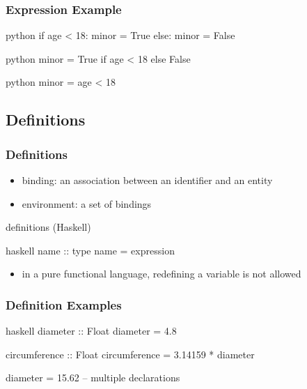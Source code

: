 \documentclass[dvipsnames]{beamer}
\theoremstyle{plain}
\begin{document}
\begin{frame}[fragile]
  \frametitle{Expression Example}

  \begin{pygments}{python}
if age < 18:
    minor = True
else:
    minor = False
  \end{pygments}

  \medskip
  \begin{pygments}{python}
minor = True if age < 18 else False
  \end{pygments}

  \pause
  \bigskip
  \begin{pygments}{python}
minor = age < 18
  \end{pygments}
\end{frame}

\subsection{Definitions}

\begin{frame}[fragile]
  \frametitle{Definitions}

  \medskip
  \begin{itemize}
    \item \alert{binding}: an association between an identifier and an entity
    \item \alert{environment}: a set of bindings
  \end{itemize}

  \begin{block}{definitions (Haskell)}
    \begin{pygments}{haskell}
name :: type
name = expression
    \end{pygments}
  \end{block}

  \pause
  \medskip
  \begin{itemize}
    \item in a pure functional language, redefining a variable is not allowed
  \end{itemize}
\end{frame}

\begin{frame}[fragile]
  \frametitle{Definition Examples}

  \begin{exampleblock}{}
    \begin{pygments}{haskell}
diameter :: Float
diameter = 4.8

circumference :: Float
circumference = 3.14159 * diameter

diameter = 15.62       -- multiple declarations
    \end{pygments}
  \end{exampleblock}
\end{frame}
\end{document}

